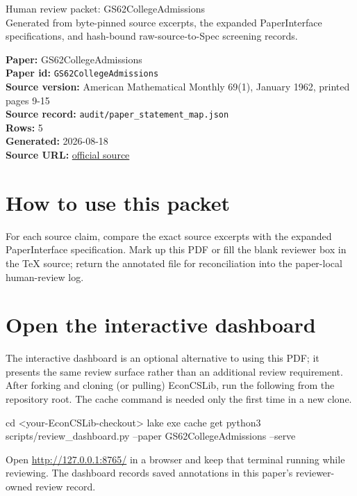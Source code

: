 \documentclass[10pt]{article}
\begin{document}
\fontsize{9}{10}\selectfont

\begin{center}
{\LARGE Human review packet: GS62CollegeAdmissions}\\[0.35em]
\small Generated from byte-pinned source excerpts, the expanded PaperInterface
specifications, and hash-bound raw-source-to-Spec screening records.
\end{center}

\noindent\textbf{Paper:} GS62CollegeAdmissions\\
\textbf{Paper id:} \texttt{GS62CollegeAdmissions}\\
\textbf{Source version:} American Mathematical Monthly 69(1), January 1962, printed pages 9-15\\
\textbf{Source record:} \texttt{audit/paper\_statement\_map.json}\\
\textbf{Rows:} 5\\
\textbf{Generated:} 2026-08-18\\
\textbf{Source URL:} \href{https://doi.org/10.1080/00029890.1962.11989827}{official source}

\noindent{}\par



\section*{How to use this packet}
For each source claim, compare the exact source excerpts with the expanded
PaperInterface specification. Mark up this PDF or fill the blank reviewer box in the TeX source;
return the annotated file for reconciliation into the paper-local human-review
log.

\section*{Open the interactive dashboard}
The interactive dashboard is an optional alternative to using this PDF; it
presents the same review surface rather than an additional review requirement.
After forking and cloning (or pulling) EconCSLib, run the following from the
repository root. The cache command is needed only the first time in a new clone.
\begin{ReviewVerbatim}
cd <your-EconCSLib-checkout>
lake exe cache get
python3 scripts/review_dashboard.py --paper GS62CollegeAdmissions --serve
\end{ReviewVerbatim}
Open \url{http://127.0.0.1:8765/} in a browser and keep that terminal running
while reviewing. The dashboard records saved annotations in this paper's
reviewer-owned review record.
\end{document}
